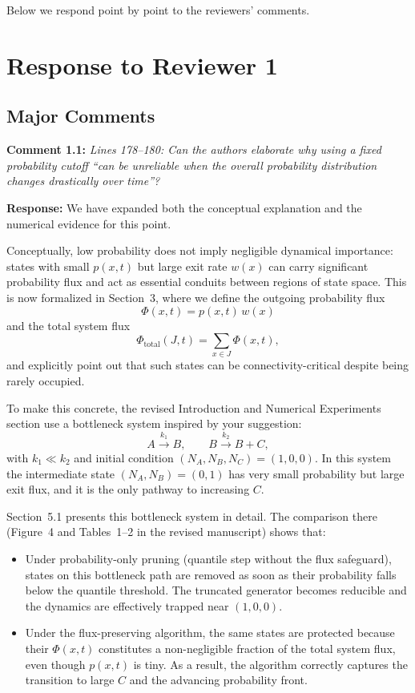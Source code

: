 \documentclass[11pt]{article}
\begin{document}
Below we respond point by point to the reviewers’ comments.

\section*{Response to Reviewer 1}

\subsection*{Major Comments}

\noindent\textbf{Comment 1.1:} \textit{Lines 178--180: Can the authors elaborate why using a fixed probability
cutoff ``can be unreliable when the overall probability distribution changes
drastically over time''?}

\textbf{Response:} We have expanded both the conceptual explanation and the numerical
evidence for this point.

Conceptually, low probability does not imply negligible dynamical importance:
states with small $p(x,t)$ but large exit rate $w(x)$ can carry significant
probability flux and act as essential conduits between regions of state space.
This is now formalized in Section~3, where we define the outgoing probability flux
\[
  \Phi(x,t) = p(x,t)\,w(x)
\]
and the total system flux
\[
  \Phi_{\mathrm{total}}(J,t)
  = \sum_{x\in J} \Phi(x,t),
\]
and explicitly point out that such states can be connectivity-critical despite
being rarely occupied.

To make this concrete, the revised Introduction and Numerical Experiments section
use a bottleneck system inspired by your suggestion:
\[
  A \xrightarrow{k_1} B, \qquad B \xrightarrow{k_2} B + C,
\]
with $k_1 \ll k_2$ and initial condition $(N_A,N_B,N_C) = (1,0,0)$. In this system
the intermediate state $(N_A,N_B)=(0,1)$ has very small probability but large exit
flux, and it is the only pathway to increasing $C$.

Section~5.1 presents this bottleneck system in detail. The comparison there (Figure~4
and Tables~1--2 in the revised manuscript) shows that:
\begin{itemize}
  \item Under probability-only pruning (quantile step without the flux safeguard),
        states on this bottleneck path are removed as soon as their probability
        falls below the quantile threshold. The truncated generator becomes
        reducible and the dynamics are effectively trapped near $(1,0,0)$.
  \item Under the flux-preserving algorithm, the same states are protected
        because their $\Phi(x,t)$ constitutes a non-negligible fraction of the
        total system flux, even though $p(x,t)$ is tiny. As a result, the
        algorithm correctly captures the transition to large $C$ and the advancing
        probability front.
\end{itemize}
\end{document}

